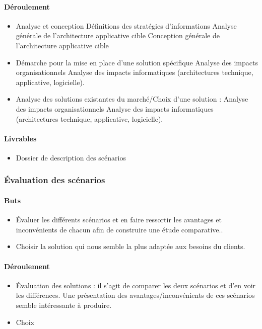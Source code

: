 \paragraph{Déroulement}
\begin{itemize}
    \item Analyse et conception
        \subitem Définitions des stratégies d’informations
        \subitem Analyse générale de l’architecture applicative cible
        \subitem Conception générale de l’architecture applicative cible
    \item Démarche pour la mise en place d’une solution spécifique
        \subitem Analyse des impacts organisationnels
        \subitem Analyse des impacts informatiques (architectures technique, applicative, logicielle).
    \item Analyse  des solutions existantes du marché/Choix d’une solution :
        \subitem Analyse des impacts organisationnels
        \subitem Analyse des impacts informatiques (architectures technique, applicative, logicielle).
\end{itemize}

\paragraph{Livrables}
\begin{itemize}
    \item Dossier de description des scénarios
\end{itemize}

\subsubsection{Évaluation des scénarios}

\paragraph{Buts}
\begin{itemize}
    \item Évaluer les différents scénarios et en faire ressortir les avantages et inconvénients de chacun afin de construire une étude comparative..
    \item Choisir la solution qui nous semble la plus adaptée aux besoins du clients.
\end{itemize}

\paragraph{Déroulement}
\begin{itemize}
    \item Évaluation des solutions : il s’agit de comparer les deux scénarios et d’en voir les différences. Une présentation des avantages/inconvénients de ces scénarios semble intéressante à produire.
    \item Choix
\end{itemize}

